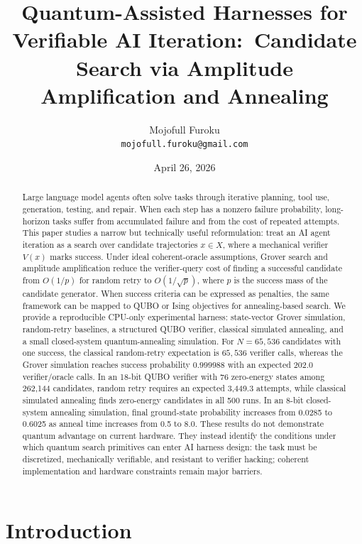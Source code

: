\documentclass[11pt]{article}
\title{Quantum-Assisted Harnesses for Verifiable AI Iteration:\ Candidate Search via Amplitude Amplification and Annealing}
\author{Mojofull Furoku\\
\texttt{mojofull.furoku@gmail.com}}
\date{April 26, 2026}
\begin{document}
\maketitle

\begin{abstract}
Large language model agents often solve tasks through iterative planning, tool use, generation, testing, and repair. When each step has a nonzero failure probability, long-horizon tasks suffer from accumulated failure and from the cost of repeated attempts. This paper studies a narrow but technically useful reformulation: treat an AI agent iteration as a search over candidate trajectories $x\in X$, where a mechanical verifier $V(x)$ marks success. Under ideal coherent-oracle assumptions, Grover search and amplitude amplification reduce the verifier-query cost of finding a successful candidate from $O(1/p)$ for random retry to $O(1/\sqrt{p})$, where $p$ is the success mass of the candidate generator. When success criteria can be expressed as penalties, the same framework can be mapped to QUBO or Ising objectives for annealing-based search. We provide a reproducible CPU-only experimental harness: state-vector Grover simulation, random-retry baselines, a structured QUBO verifier, classical simulated annealing, and a small closed-system quantum-annealing simulation. For $N=65{,}536$ candidates with one success, the classical random-retry expectation is $65{,}536$ verifier calls, whereas the Grover simulation reaches success probability $0.999988$ with an expected $202.0$ verifier/oracle calls. In an 18-bit QUBO verifier with 76 zero-energy states among 262,144 candidates, random retry requires an expected 3,449.3 attempts, while classical simulated annealing finds zero-energy candidates in all 500 runs. In an 8-bit closed-system annealing simulation, final ground-state probability increases from 0.0285 to 0.6025 as anneal time increases from 0.5 to 8.0. These results do not demonstrate quantum advantage on current hardware. They instead identify the conditions under which quantum search primitives can enter AI harness design: the task must be discretized, mechanically verifiable, and resistant to verifier hacking; coherent implementation and hardware constraints remain major barriers.
\end{abstract}

\section{Introduction}
\end{document}
